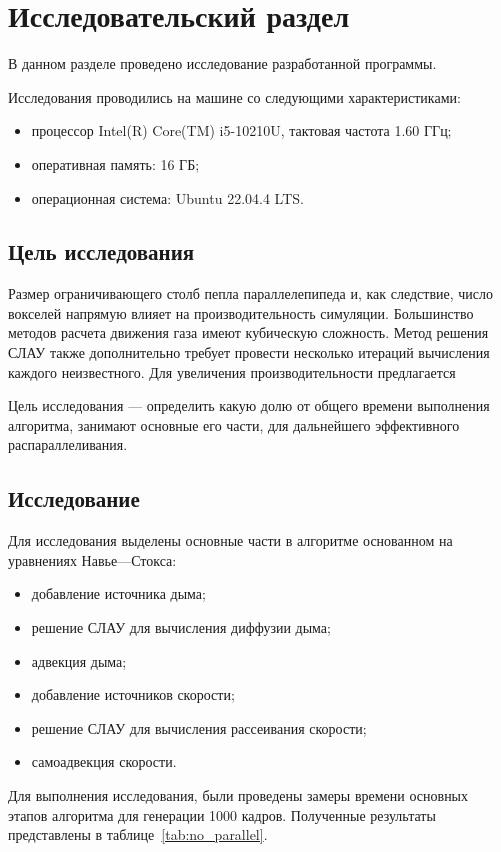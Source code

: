 \chapter{Исследовательский раздел}
В данном разделе проведено исследование разработанной программы.

Исследования проводились на машине со следующими характеристиками:
\begin{itemize}[label=---]
	\item процессор Intel(R) Core(TM) i5-10210U, тактовая частота 1.60 ГГц;
	\item оперативная память: 16 ГБ;
	\item операционная система: Ubuntu 22.04.4 LTS.
\end{itemize}

\section{Цель исследования}

Размер ограничивающего столб пепла параллелепипеда и, как следствие, число вокселей напрямую влияет на производительность симуляции. Большинство методов расчета движения газа имеют кубическую сложность. Метод решения СЛАУ также дополнительно требует провести несколько итераций вычисления каждого неизвестного. Для увеличения производительности предлагается~\cite{norway}

Цель исследования --- определить какую долю от общего времени выполнения алгоритма, занимают основные его части, для дальнейшего эффективного распараллеливания.

\section{Исследование}

Для исследования выделены основные части в алгоритме основанном на уравнениях Навье---Стокса:
\begin{itemize}
	\item добавление источника дыма;
	\item решение СЛАУ для вычисления диффузии дыма;
	\item адвекция дыма;
	\item добавление источников скорости;
	\item решение СЛАУ для вычисления рассеивания скорости;
	\item самоадвекция скорости.
\end{itemize}

Для выполнения исследования, были проведены замеры времени основных этапов алгоритма для генерации 1000 кадров. Полученные результаты представлены в таблице~\ref{tab:no_parallel}.

